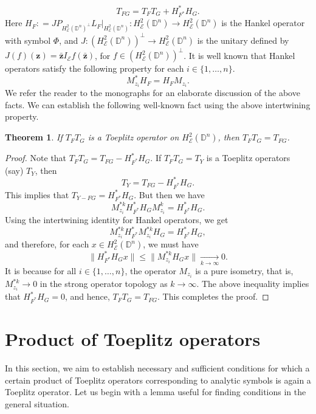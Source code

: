\documentclass[12pt]{amsart}
\newtheorem{thm}[propn]{Theorem}
\theoremstyle{definition}
\newcommand{\D}{\mathbb{D}}
\newcommand{\1}{{\mbox{\bf 1}}}
\newcommand{\cle}{\mathcal{E}}
\newcommand{\raro}{\rightarrow}
\begin{document}
\[
T_{FG} = T_{F} T_{G} + H_{F^*}^* H_{G}.
\]
Here $H_{F}: = JP_{H_{\cle}^{2}(\D^n)^{\perp}} L_{F}|_{H_{\cle}^{2}(\D^n)}: H_{\cle}^{2}(\D^n) \raro H_{\cle}^{2}(\D^n)$ is the Hankel operator with symbol $\Phi$, and $J: (H_{\cle}^2(\D^n))^{\perp} \raro  H_{\cle}^2(\D^n)$ is the unitary defined by $J(f)(\bm{z}) = \bar{\bm{z}} I_{\cle}f(\bar{\bm{z}})$, for $f \in (H_{\cle}^2(\D^n))^{\perp}$. It is well known that Hankel operators satisfy the following property for each $i \in \{1,\ldots,n\}$. 
\begin{equation}\label{comm}
M_{z_i}^* H_F = H_F M_{z_i}.
\end{equation}
We refer the reader to the monographs \cite{BS, Peller} for an elaborate discussion of the above facts. We can establish the following well-known fact using the above intertwining property.

\begin{thm}\label{ptoep}
If $T_F T_G$ is a Toeplitz operator on $H_{\cle}^2(\D^n)$, then $T_F T_G = T_{FG}$.
\end{thm}
\begin{proof}
Note that $T_F T_G = T_{FG} - H_{F^*}^* H_G$. If $T_F T_G = T_Y$ is a Toeplitz operators (say) $T_Y$, then 
\[
T_Y =  T_{FG} - H_{F^*}^* H_G.
\]
This implies that $T_{Y - FG} =  H_{F^*}^* H_G$. But then we have
\[
M_{z_i}^{*k} H_{F^*}^* H_G M_{z_i}^{k} = H_{F^*}^* H_G.
\]
Using the intertwining identity for Hankel operators, we get
\[
M_{z_i}^{*k} H_{F^*}^* M_{z_i}^{*k} H_G  = H_{F^*}^* H_G,
\]
and therefore, for each $x \in H_{\cle}^2(\D^n)$, we must have
\[
\|H_{F^*}^* H_G x\| \leq \|M_{z_i}^{*k} H_G  x\| \underset{k \raro \infty}{\raro} 0.
\]
It is because for all $i \in \{1,\ldots,n\}$, the operator $M_{z_i}$ is a pure isometry, that is,  $M_{z_i}^{*k} \raro 0$ in the strong operator topology as $k \raro \infty$. The above inequality implies that $H_{F^*}^* H_G =0$, and hence, $T_F T_G = T_{FG} $. This completes the proof.
\end{proof}

\section{Product of Toeplitz operators}\label{product}
In this section, we aim to establish necessary and sufficient conditions for which a certain product of Toeplitz operators corresponding to analytic symbols is again a Toeplitz operator. Let us begin with a lemma useful for finding conditions in the general situation.
\end{document}

